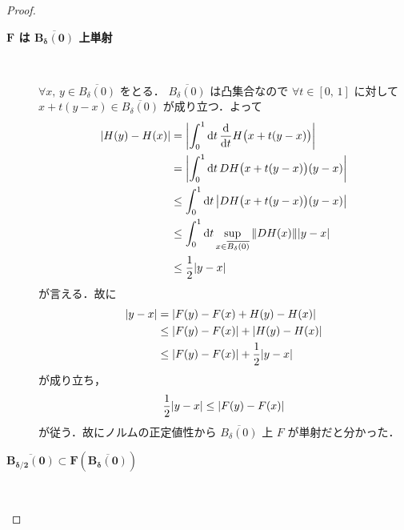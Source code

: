 \documentclass[geometry_main]{subfiles}
\begin{document}
\begin{proof}
    \begin{description}
        \item[\textbf{$\bm{F}$ は $\bm{\overline{B_\delta(0)}}$ 上単射}]　
        
        $\forall x,\, y \in \overline{B_\delta(0)}$ をとる．
        $\overline{B_\delta(0)}$ は凸集合なので $\forall t \in [0,\, 1]$ に対して $x + t(y - x) \in \overline{B_\delta(0)}$ が成り立つ．よって
        \begin{align}
            \abs{H(y) - H(x)} 
            &= \abs{\int_0^1 \dd{t} \dv{}{t} H\bigl(x + t(y - x)\bigr)} \\
            &= \abs{\int_0^1 \dd{t} DH \bigl( x + t(y - x) \bigr) (y - x)} \\
            &\le \int_0^1 \dd{t} \abs{DH \bigl( x + t(y - x) \bigr) (y - x)} \\
            &\le \int_0^1 \dd{t} \sup_{x \in \overline{B_\delta(0)}} \norm{DH(x)} \abs{y-x} \\
            &\le \frac{1}{2} \abs{y-x} \label{ineq:thm-inv-1}
        \end{align}
        が言える．故に
        \begin{align}
            \abs{y - x} 
            &= \abs{F(y) - F(x) + H(y) - H(x)} \\
            &\le \abs{F(y) - F(x)} + \abs{H(y) - H(x)} \\
            &\le \abs{F(y) - F(x)} + \frac{1}{2}\abs{y - x}
        \end{align}
        が成り立ち，
        \begin{align}
            \label{ineq:thm-inv-2}
            \frac{1}{2} \abs{y - x} \le \abs{F(y) - F(x)}
        \end{align}
        が従う．故にノルムの正定値性から $\overline{B_\delta(0)}$ 上 $F$ が単射だと分かった．
        
        \item[$\bm{\overline{B_{\delta/2}(0)} \subset F(\overline{B_\delta(0)})}$]　
        

\end{description}
\end{proof}
\end{document}
